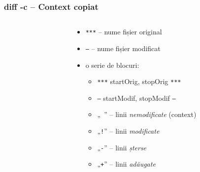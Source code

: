 \documentclass{beamer}
\begin{document}
\begin{frame}
  \frametitle{\textbf{diff -c} – Context copiat}
  \begin{columns}

    \begin{column}{6cm}
      \footnotesize \tt 
    \end{column}

    \begin{column}{10cm}
      \begin{itemize}
      \item \texttt{\texttt{***}} – nume fișier original
      \item \texttt{\texttt{---}} – nume fișier modificat
      \item o serie de blocuri:
        \begin{itemize}
        \item \texttt{***} startOrig, stopOrig \texttt{***}
        \item \texttt{---} startModif, stopModif \texttt{---}
        \item „\texttt{ }” – linii \textit{nemodificate} (context)
        \item „\texttt{!}” – linii \textit{modificate}
        \item „\texttt{-}” – linii \textit{șterse}
        \item „\texttt{+}” – linii \textit{adăugate}
        \end{itemize}
      \end{itemize}
    \end{column}

  \end{columns}
\end{frame}
\end{document}
